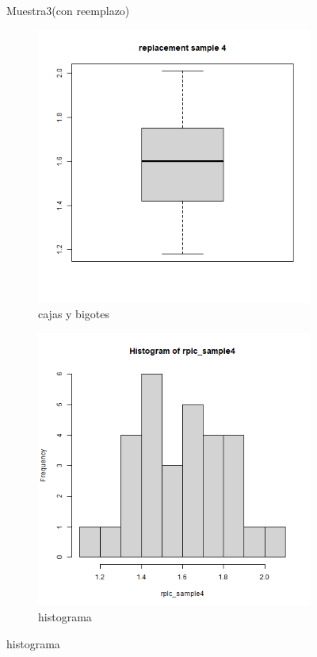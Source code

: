 \documentclass[a4paper,12pt]{article}
\begin{document}
\begin{enumerate}
\begin{figure}[t!]
    
    \caption{Muestra3(con reemplazo)}
    \label{figure}
\end{figure}

\begin{figure}[t!]
    \centering
    \begin{subfigure}[b]{0.4\linewidth}             
        \includegraphics[width = \linewidth]{./datos generados (Ejercicio 1)/replacement_sample4_boxplot.png}
        \caption{cajas y bigotes}
    \end{subfigure}
    \begin{subfigure}[b]{0.4\linewidth}               
        \includegraphics[width = \linewidth]{./datos generados (Ejercicio 1)/replacement_sample4_hist.png}
        \caption{histograma}
    \end{subfigure}


\end{figure}
\end{enumerate}
\end{document}
